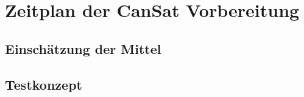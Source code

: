 \section{Zeitplan der CanSat Vorbereitung}

\subsection{Einschätzung der Mittel}
\subsection{Testkonzept}